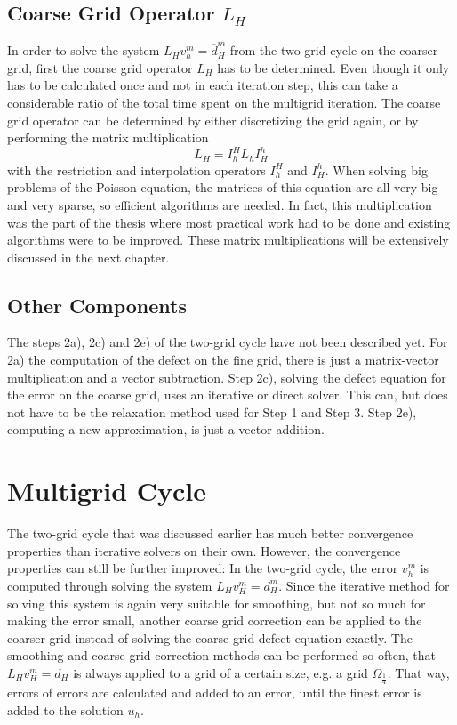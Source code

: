 \subsection{Coarse Grid Operator $L_H$}
\label{sec:PtAP}
In order to solve the system $L_H v_h^m = \overline{d}_H^m$ from the two-grid cycle on the coarser grid, first the coarse grid operator $L_H$ has to be determined. Even though it only has to be calculated once and not in each iteration step, this can take a considerable ratio of the total time spent on the multigrid iteration. The coarse grid operator can be determined by either discretizing the grid again, or by performing the matrix multiplication
\begin{equation}
L_H = I_h^H L_h I_H^h
\end{equation}
with the restriction and interpolation operators $I_h^H$ and $I_H^h$. When solving big problems of the Poisson equation, the matrices of this equation are all very big and very sparse, so efficient algorithms are needed. In fact, this multiplication was the part of the thesis where most practical work had to be done and existing algorithms were to be improved. These matrix multiplications will be extensively discussed in the next chapter. 

\subsection{Other Components}
The steps 2a), 2c) and 2e) of the two-grid cycle have not been described yet. For 2a) the computation of the defect on the fine grid, there is just a matrix-vector multiplication and a  vector subtraction. Step 2c), solving the defect equation for the error on the coarse grid, uses an iterative or direct solver. This  can, but does not have to be the relaxation method used for Step 1 and Step 3. Step 2e), computing a new approximation, is just a vector addition. 

\section{Multigrid Cycle}
\label{sec:multigrid_cycle}
The two-grid cycle that was discussed earlier has much better convergence properties than iterative solvers on their own. However, the convergence properties can still be further improved: In the two-grid cycle, the error $v_h^m$ is computed through solving the system $L_H v_H^m = d_H^m$. Since the iterative method for solving this system is again very suitable for smoothing, but not so much for making the error small, another coarse grid correction can be applied to the coarser grid instead of solving the coarse grid defect equation exactly.  The smoothing and coarse grid correction methods can be performed so often, that $L_H v_H^m = d_H$ is always applied to a grid of a certain size, e.g. a grid $\Omega_{\frac{1}{4}}$. That way, errors of errors are calculated and added to an error, until the finest error is added to the solution $u_h$. 

